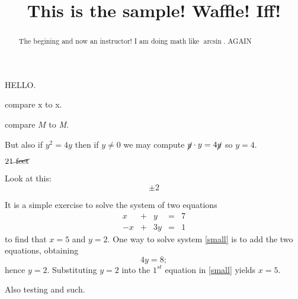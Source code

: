 \documentclass{ximera}
\title[Breal-grond]{This is the sample! Waffle!  Iff!}
\begin{document}
\begin{abstract}
  The begining and now an instructor! I am doing math like $\arcsin$. AGAIN
\end{abstract}

\maketitle

HELLO.


compare $\mathrm{x}$ to x.

compare $M$ to \textit{M}.

But also if $y^2 = 4y$ then if $y \neq 0$ we may compute $\cancel{y} \cdot y = 4 \cancel{y}$ so $y = 4$.

$21 \cancel{\textrm{ feet}}$

Look at this:
\[
  \pm 2
\]








It is a simple exercise to solve the system of two equations
\begin{equation} \label{small}
\begin{array}{rcrcr}
 x & + & y & = & 7 \\
-x & + & 3y & = & 1
\end{array}
\end{equation}
to find that $x=5$ and $y=2$.  One way to solve
system \eqref{small} is to add the two equations, obtaining
\[
4y=8;
\]
hence $y=2$.  Substituting $y=2$ into the $1^{st}$ equation in
\ref{small} yields $x=5$.

\begin{problem}
  Also testing  and such.
\end{problem}
\end{document}
